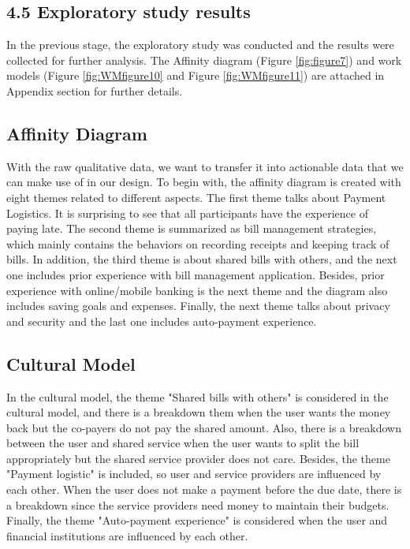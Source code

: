 \documentclass{sigchi}
\begin{document}
\subsection{4.5 Exploratory study results}

In the previous stage, the exploratory study was conducted and the results were collected for further analysis. The Affinity diagram (Figure \ref{fig:figure7}) and work models (Figure \ref{fig:WMfigure10} and Figure \ref{fig:WMfigure11}) are attached in Appendix section for further details.

\subsection{Affinity Diagram}

With the raw qualitative data, we want to transfer it into actionable data that we can make use of in our design. To begin with, the affinity diagram is created with eight themes related to different aspects. The first theme talks about Payment Logistics. It is surprising to see that all participants have the experience of paying late. The second theme is summarized as bill management strategies, which mainly contains the behaviors on recording receipts and keeping track of bills. In addition, the third theme is about shared bills with others, and the next one includes prior experience with bill management application. Besides, prior experience with online/mobile banking is the next theme and the diagram also includes saving goals and expenses. Finally, the next theme talks about privacy and security and the last one includes auto-payment experience.


\subsection{Cultural Model}

In the cultural model, the theme "Shared bills with others" is considered in the cultural model, and there is a breakdown them when the user wants the money back but the co-payers do not pay the shared amount. Also, there is a breakdown between the user and shared service when the user wants to split the bill appropriately but the shared service provider does not care. Besides, the theme "Payment logistic" is included, so user and service providers are influenced by each other. When the user does not make a payment before the due date, there is a breakdown since the service providers need money to maintain their budgets. Finally, the theme "Auto-payment experience" is considered when the user and financial institutions are influenced by each other.
\end{document}
